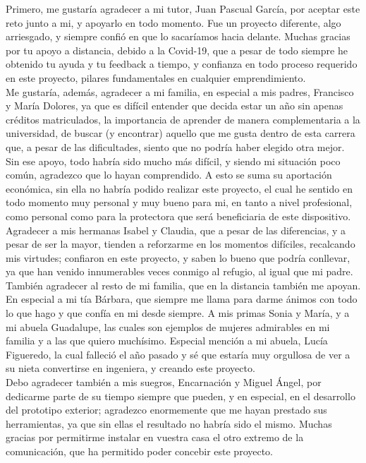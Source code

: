 \documentclass[12pt]{article}
\begin{document}
	\noindent Primero, me gustaría agradecer a mi tutor, Juan Pascual García, por aceptar este reto junto a mi, y apoyarlo en todo momento. Fue un proyecto diferente, algo arriesgado, y siempre confió en que lo sacaríamos hacia delante. Muchas gracias por tu apoyo a distancia, debido a la Covid-19, que a pesar de todo siempre he obtenido tu ayuda y tu feedback a tiempo, y confianza en todo proceso requerido en este proyecto, pilares fundamentales en cualquier emprendimiento.\\
	
	\noindent Me gustaría, además, agradecer a mi familia, en especial a mis padres, Francisco y María Dolores, ya que es difícil entender que decida estar un año sin apenas créditos matriculados, la importancia de aprender de manera complementaria a la universidad, de buscar (y encontrar) aquello que me gusta dentro de esta carrera que, a pesar de las dificultades, siento que no podría haber elegido otra mejor. Sin ese apoyo, todo habría sido mucho más difícil, y siendo mi situación poco común, agradezco que lo hayan comprendido. A esto se suma su aportación económica, sin ella no habría podido realizar este proyecto, el cual he sentido en todo momento muy personal y muy bueno para mi, en tanto a nivel profesional, como personal como para la protectora que será beneficiaria de este dispositivo. Agradecer a mis hermanas Isabel y Claudia, que a pesar de las diferencias, y a pesar de ser la mayor, tienden a reforzarme en los momentos difíciles, recalcando mis virtudes; confiaron en este proyecto, y saben lo bueno que podría conllevar, ya que han venido innumerables veces conmigo al refugio, al igual que mi padre.\\
	
	\noindent También agradecer al resto de mi familia, que en la distancia también me apoyan. En especial a mi tía Bárbara, que siempre me llama para darme ánimos con todo lo que hago y que confía en mi desde siempre. A mis primas Sonia y María, y a mi abuela Guadalupe, las cuales son ejemplos de mujeres admirables en mi familia y a las que quiero muchísimo. Especial mención a mi abuela, Lucía Figueredo, la cual falleció el año pasado y sé que estaría muy orgullosa de ver a su nieta convertirse en ingeniera, y creando este proyecto. \\
	
	\noindent Debo agradecer también a mis suegros, Encarnación y Miguel Ángel, por dedicarme parte de su tiempo siempre que pueden, y en especial, en el desarrollo del prototipo exterior; agradezco enormemente que me hayan prestado sus herramientas, ya que sin ellas el resultado no habría sido el mismo. Muchas gracias por permitirme instalar en vuestra casa el otro extremo de la comunicación, que ha permitido poder concebir este proyecto. \\
	
\end{document}
